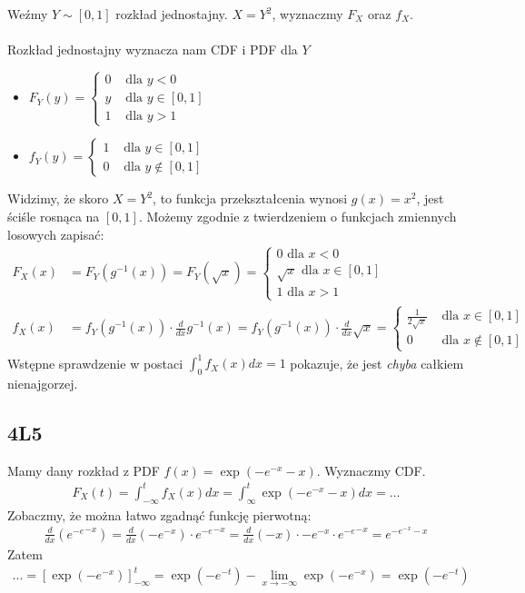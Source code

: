 \documentclass{article}
\begin{document}
Weźmy $Y\sim [0,1]$ rozkład jednostajny. $X=Y^2$, wyznaczmy $F_X$ oraz $f_X$.\\\\
\noindent
Rozkład jednostajny wyznacza nam CDF i PDF dla $Y$
\begin{itemize}
    \item $F_Y(y) = \begin{cases}
        0 &\text{ dla } y < 0\\
        y &\text{ dla } y \in[0,1]\\
        1 &\text{ dla } y > 1 
    \end{cases}$
    \item $f_Y(y)=\begin{cases}
        1 &\text{ dla } y\in[0,1]\\
        0 &\text{ dla } y\notin[0,1]
    \end{cases}$
\end{itemize}
\noindent
Widzimy, że skoro $X=Y^2$, to funkcja przekształcenia wynosi $g(x)=x^2$, jest ściśle rosnąca na $[0,1]$. Możemy zgodnie z twierdzeniem o funkcjach zmiennych losowych zapisać:
\setcounter{equation}{0}
\begin{align}
    F_X(x) &= F_Y(g^{-1}(x)) = F_Y(\sqrt{x}) = \begin{cases}
        0 \text{ dla } x < 0\\
        \sqrt{x} \text{ dla } x \in[0,1]\\
        1 \text{ dla } x > 1 
    \end{cases}\\
    f_X(x) &= f_Y(g^{-1}(x)) \cdot \frac{d}{dx} g^{-1} (x) = f_Y(g^{-1}(x)) \cdot \frac{d}{dx} \sqrt{x} = \begin{cases}
        \frac{1}{2\sqrt{x}} &\text { dla } x\in[0,1]\\
        0 &\text{ dla } x\notin[0,1]
    \end{cases} 
\end{align}
Wstępne sprawdzenie w postaci $\int_{0}^{1} f_X(x) dx=1$ pokazuje, że jest \textit{chyba} całkiem nienajgorzej.

\subsection{4L5}

Mamy dany rozkład z PDF $f(x) = \exp(-e^{-x}-x)$. Wyznaczmy CDF.
\setcounter{equation}{0}
\begin{align}
    F_X(t)= \int_{-\infty}^{t} f_X(x) dx = \int_{\infty}^{t} \exp(-e^{-x}-x)dx = \dots
\end{align}
Zobaczmy, że można łatwo zgadnąć funkcję pierwotną:
\begin{align}
    \frac{d}{dx} \left({e^{-e}}^{-x}\right)=
    \frac{d}{dx} \left(-e^{-x}\right) \cdot {e^{-e}}^{-x}=
    \frac{d}{dx} (-x) \cdot -e^{-x} \cdot {e^{-e}}^{-x} = e^{-e^{-x}-x}
\end{align}
Zatem
\begin{align}
    ... = \left[\exp(-e^{-x})\right]_{-\infty}^{t} = \exp(-e^{-t}) - \lim_{x\rightarrow -\infty} \exp(-e^{-x}) = \exp(-e^{-t})
\end{align}
\end{document}
